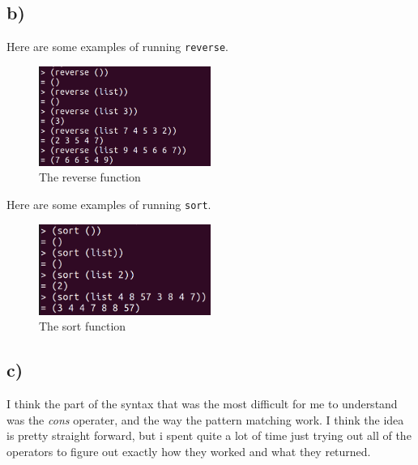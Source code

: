 \subsection*{b)}
Here are some examples of running \texttt{reverse}.
\begin{figure}[h]
    \centering
    \includegraphics[width=0.5\textwidth]{rev.png}
    \caption{The reverse function}
\end{figure}

Here are some examples of running \texttt{sort}.
\begin{figure}[h]
    \centering
    \includegraphics[width=0.5\textwidth]{sort.png}
    \caption{The sort function}
\end{figure}


\subsection*{c)}
I think the part of the syntax that was the most difficult for me to understand was the \textit{cons} operater, and the way the pattern matching work. I think the idea is pretty straight forward, but i spent quite a lot of time just trying out all of the operators to figure out exactly how they worked and what they returned.
